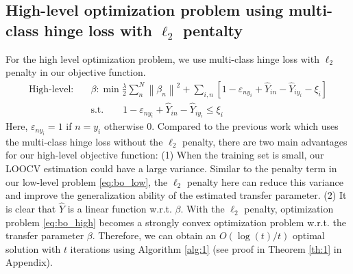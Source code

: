 \subsection{High-level optimization problem using multi-class hinge loss with $\ell_2$ pentalty} 
For the high level optimization problem, we use multi-class hinge loss \cite{crammer2002algorithmic} with $\ell_2$ penalty in our objective function.
\begin{equation}\label{eq:bo_high}
\begin{aligned}
\text{High-level:}\quad&\beta: \min \frac{{{\lambda}}}{2}\sum\limits_{n}^N {{{\left\| {{\beta _n}} \right\|}^2}}  + \sum\limits_{i,n}\left[ {1 - {\varepsilon _{n{y_i}}} + {{\hat Y}_{in}} - {{\hat Y}_{i{y_i}}} - {\xi _i}} \right]\\
&\text{s.t.} \qquad1 - {\varepsilon _{n{y_i}}} + {\hat Y_{in}} - {\hat Y_{i{y_i}}} \le {\xi_i}
\end{aligned}
\end{equation}
Here, $\varepsilon _{n{y_i}}=1$ if $n=y_i$ otherwise 0.
Compared to the previous work \cite{kuzborskij2013n,tommasi2014learning} which uses the multi-class hinge loss without the $\ell_2$ penalty, there are two main advantages for our high-level objective function: (1) When the training set is small, our LOOCV estimation could have a large variance. Similar to the penalty term in our low-level problem \eqref{eq:bo_low},  the $\ell_2$ penalty here can {reduce this variance and improve the generalization ability of the estimated transfer parameter}. (2) It is clear that $\hat{Y}$ is a linear function w.r.t. $\beta$. With the $\ell_2$ penalty, optimization problem \eqref{eq:bo_high} becomes a strongly convex optimization problem w.r.t. the transfer parameter $\beta$. Therefore, we can obtain an $O({\log(t)}/{t})$ optimal solution with $t$ iterations using Algorithm \ref{alg:1} (see proof in Theorem \ref{th:1} in Appendix).
 